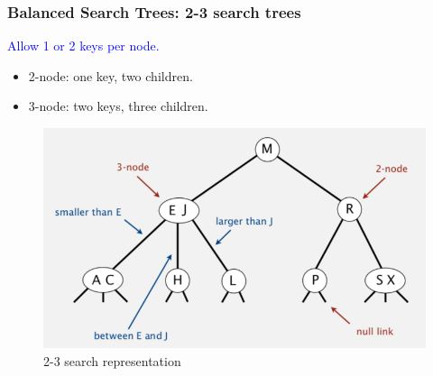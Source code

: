 \documentclass[11pt]{beamer}
\begin{document}
\begin{frame}
	\frametitle{Balanced Search Trees:  2-3 search trees}
	\textcolor{blue}{ Allow 1 or 2 keys per node.}\\
	\begin{itemize}
		\item 2-node: one key, two children. 
		\item 3-node: two keys, three children.
	\end{itemize}
	\begin{figure}
		\centering
		\includegraphics[width=0.8\linewidth]{"Screenshot 2020-11-24 at 5.50.40 PM"}
		\caption{2-3 search representation}
		\label{fig:screenshot-2020-11-24-at-5}
	\end{figure}
\end{frame}		
\end{document}
